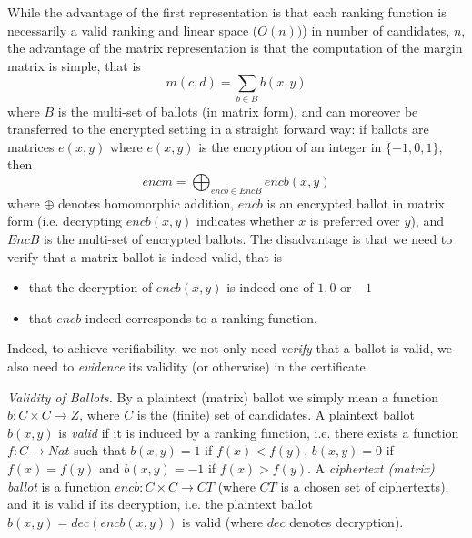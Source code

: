 While the advantage of the first representation is that each ranking
function is necessarily a valid ranking and linear space ($O(n))$) in number 
of candidates, $n$, the advantage of the matrix 
representation is that the computation of
the margin matrix is simple, that is
\[ m(c, d) = \sum_{b \in B} b(x, y) \]
where $B$ is the multi-set of ballots (in matrix form), and can
moreover be transferred to the encrypted setting in a straight
forward way: if ballots are matrices $e(x,y)$ where $e(x,y)$ is the
encryption of an integer in $\lbrace -1, 0, 1 \rbrace$, then
\begin{equation}\label{eqn:enc-mm}
encm = \bigoplus_{encb \in EncB} encb(x, y) 
\end{equation}
where $\oplus$ denotes homomorphic addition, $encb$ is an encrypted
ballot in matrix form (i.e. decrypting $encb(x, y)$ indicates
whether $x$ is preferred over $y$), and $EncB$ is the multi-set of
encrypted ballots. The disadvantage is that we need to verify that a
matrix ballot is indeed valid, that is
\begin{itemize}
\item that the decryption of $encb(x, y)$ is indeed one of $1, 0$ or
$-1$
\item that $encb$ indeed corresponds to a ranking function.
\end{itemize}

\noindent
Indeed, to achieve verifiability, we not only need \emph{verify}
that a ballot is valid, we also need to \emph{evidence} its validity
(or otherwise) in the certificate.  

\smallskip\noindent\emph{Validity of Ballots.} By a plaintext
(matrix) ballot
we simply mean a function $b: C \times C \to Z$,
where $C$ is the (finite) set of candidates. A 
plaintext ballot $b(x, y)$ 
is \emph{valid} if it is induced by a ranking function, i.e.
there exists a function $f: C \to Nat$ such that $b(x, y) = 1$ if
$f(x) < f(y)$, $b(x, y) = 0$ if $f(x) = f(y)$ and $b(x, y) = -1$ if
$f(x) > f(y)$. A \emph{ciphertext (matrix) ballot} is a function
$encb: C \times C \to CT$ (where $CT$ is a chosen set of
ciphertexts), and it is valid if its decryption,  i.e. the plaintext
ballot $b(x, y)  = dec(encb(x, y))$ is valid (where $dec$ denotes
decryption).

